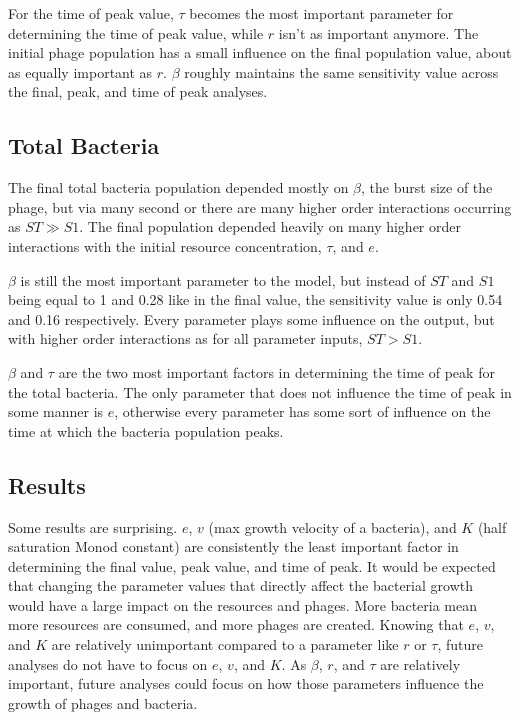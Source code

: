 For the time of peak value, $\tau$ becomes the most important parameter for determining the time of peak value, while $r$ isn't as important anymore. 
The initial phage population has a small influence on the final population value, about as equally important as $r$. 
$\beta$ roughly maintains the same sensitivity value across the final, peak, and time of peak analyses. 

\subsection{Total Bacteria}
The final total bacteria population depended mostly on $\beta$, the burst size of the phage, but via many second or there are many higher order interactions occurring as $ST \gg S1$. 
The final population depended heavily on many higher order interactions with the initial resource concentration, $\tau$, and $e$. 

$\beta$ is still the most important parameter to the model, but instead of $ST$ and $S1$ being equal to 1 and 0.28 like in the final value, the sensitivity value is only 0.54 and 0.16 respectively. 
Every parameter plays some influence on the output, but with higher order interactions as for all parameter inputs, $ST > S1$. 

$\beta$ and $\tau$ are the two most important factors in determining the time of peak for the total bacteria. 
The only parameter that does not influence the time of peak in some manner is $e$, otherwise every parameter has some sort of influence on the time at which the bacteria population peaks. 

\subsection{Results}
Some results are surprising. 
$e$, $v$ (max growth velocity of a bacteria), and $K$ (half saturation Monod constant) are consistently the least important factor in determining the final value, peak value, and time of peak. 
It would be expected that changing the parameter values that directly affect the bacterial growth would have a large impact on the resources and phages. 
More bacteria mean more resources are consumed, and more phages are created. 
Knowing that $e$, $v$, and $K$ are relatively unimportant compared to a parameter like $r$ or $\tau$, future analyses do not have to focus on $e$, $v$, and $K$. 
As $\beta$, $r$, and $\tau$ are relatively important, future analyses could focus on how those parameters influence the growth of phages and bacteria. 


